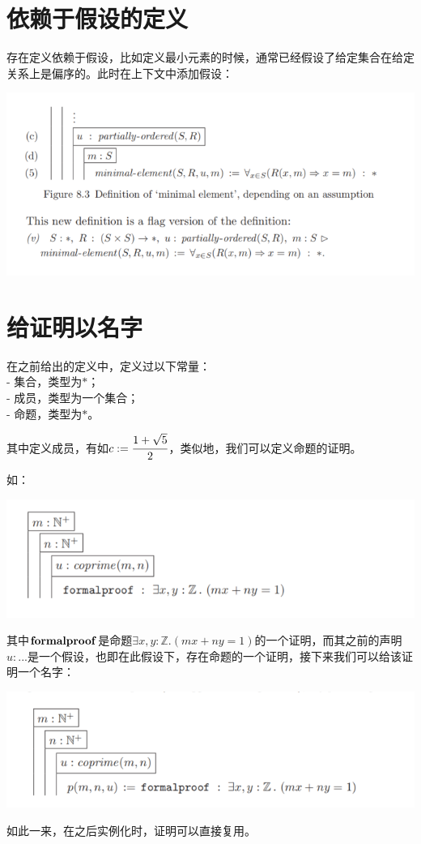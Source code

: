 \documentclass[UTF8]{article}
\begin{document}
	\section{依赖于假设的定义}
	\noindent
	存在定义依赖于假设，比如定义最小元素的时候，通常已经假设了给定集合在给定关系上是偏序的。此时在上下文中添加假设：
	
		\noindent
		\includegraphics[width=0.93\linewidth]{"../imgs/8-1.png"}
	
	\section{给证明以名字}
	\noindent
	在之前给出的定义中，定义过以下常量：\\
	- 集合，类型为$*$；\\
	- 成员，类型为一个集合；\\
	- 命题，类型为$*$。
	
		其中定义成员，有如$c:=\cfrac{1+\sqrt{5}}{2}$，类似地，我们可以定义命题的证明。
		
		如：
		
		\noindent
		\includegraphics[width=0.93\linewidth]{"../imgs/8-2.png"}
		
		其中$\bf formalproof$是命题$\exists x,y:\mathbb{Z}.(mx+ny=1)$的一个证明，而其之前的声明$u:...$是一个假设，也即在此假设下，存在命题的一个证明，接下来我们可以给该证明一个名字：
		
		\noindent
		\includegraphics[width=0.93\linewidth]{"../imgs/8-3.png"}
		
		如此一来，在之后实例化时，证明可以直接复用。
\end{document}
